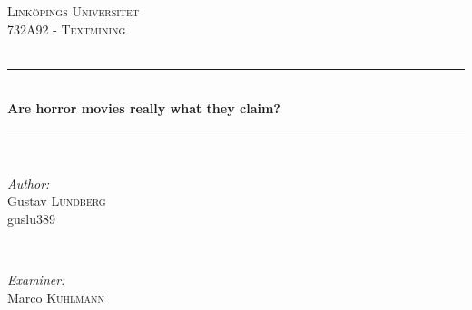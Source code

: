 \documentclass[11pt,a4paper]{article}
\begin{document}
\newcommand\numberthis{\addtocounter{equation}{1}\tag{\theequation}}

\begin{titlepage}
\pagecolor{black!90}
\color{red}
\Fontskrivan
\newcommand{\HRule}{\rule{\linewidth}{0.5mm}} %


\center %
 

\textsc{\LARGE Linköpings Universitet}\\[0.5cm] %
\textsc{\Large 732A92 - Textmining}\\[0.5cm] %
\textsc{\large }\\[4.5cm] %


\HRule \\[0.4cm]
{ \huge \bfseries Are horror movies really what they claim?}\\[0.4cm] %
\HRule \\[1.5cm]
 

\begin{minipage}{0.4\textwidth}
\begin{flushleft} \large
\emph{Author:}\\
Gustav \textsc{Lundberg} \\ %
guslu389
\end{flushleft}
\end{minipage}
~
\begin{minipage}{0.4\textwidth}
\begin{flushright} \large
\emph{Examiner:} \\
Marco \textsc{Kuhlmann} %
\end{flushright}
\end{minipage}\\[2cm]


\end{titlepage}
\end{document}
